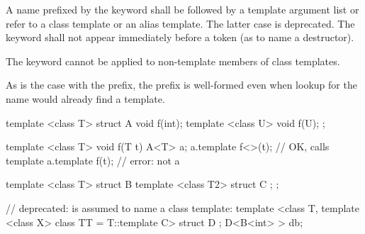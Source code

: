 \pnum
A name prefixed by the keyword
shall be followed by a template argument list or
refer to a class template or an alias template.
The latter case is deprecated.
The keyword  shall not appear immediately
before a \tcode{\~} token (as to name a destructor).
\begin{note}
The keyword
cannot be applied to non-template members of class templates.
\end{note}
\begin{note}
As is the case with the
prefix, the
prefix is well-formed
even when lookup for the name would already find a template.
\end{note}
\begin{example}
\begin{codeblock}
template <class T> struct A {
  void f(int);
  template <class U> void f(U);
};

template <class T> void f(T t) {
  A<T> a;
  a.template f<>(t);                    // OK, calls template
  a.template f(t);                      // error: not a 
}

template <class T> struct B {
  template <class T2> struct C { };
};

// deprecated:  is assumed to name a class template:
template <class T, template <class X> class TT = T::template C> struct D { };
D<B<int> > db;
\end{codeblock}
\end{example}

